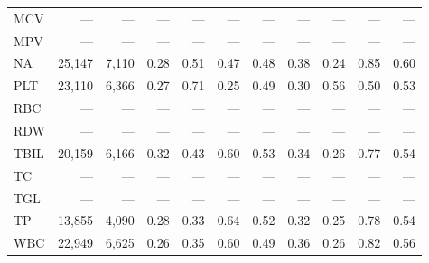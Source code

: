 \begin{table}[ht]
\begin{tabular}{lrrrrrrrrrr}
MCV & --- & --- & --- & --- & --- & --- & --- & --- & --- & --- \\
MPV & --- & --- & --- & --- & --- & --- & --- & --- & --- & --- \\
NA & 25,147 & 7,110 & 0.28 & 0.51 & 0.47 & 0.48 & 0.38 & 0.24 & 0.85 & 0.60 \\
PLT & 23,110 & 6,366 & 0.27 & 0.71 & 0.25 & 0.49 & 0.30 & 0.56 & 0.50 & 0.53 \\
RBC & --- & --- & --- & --- & --- & --- & --- & --- & --- & --- \\
RDW & --- & --- & --- & --- & --- & --- & --- & --- & --- & --- \\
TBIL & 20,159 & 6,166 & 0.32 & 0.43 & 0.60 & 0.53 & 0.34 & 0.26 & 0.77 & 0.54 \\
TC & --- & --- & --- & --- & --- & --- & --- & --- & --- & --- \\
TGL & --- & --- & --- & --- & --- & --- & --- & --- & --- & --- \\
TP & 13,855 & 4,090 & 0.28 & 0.33 & 0.64 & 0.52 & 0.32 & 0.25 & 0.78 & 0.54 \\
WBC & 22,949 & 6,625 & 0.26 & 0.35 & 0.60 & 0.49 & 0.36 & 0.26 & 0.82 & 0.56 \\
\bottomrule
\end{tabular}
\label{tab:12_eval_detail_inspire_unplanned_icu}
\end{table}